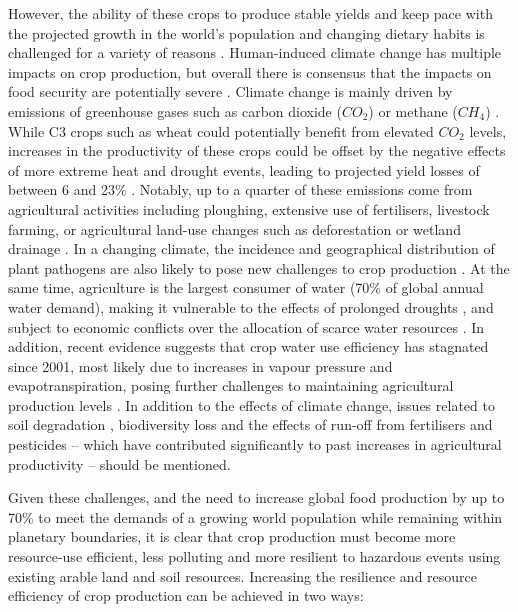 However, the ability of these crops to produce stable yields and keep pace with the projected growth in the world's population and changing dietary habits is challenged for a variety of reasons \citep{tilman_global_2011}. Human-induced climate change has multiple impacts on crop production, but overall there is consensus that the impacts on food security are potentially severe \citep{schmidhuber_global_2007,godfray_food_2010,rezaei_climate_2023}. Climate change is mainly driven by emissions of greenhouse gases such as carbon dioxide ($CO_2$) or methane ($CH_4$) \citep{ipcc_summary_2023}. While C3 crops such as wheat could potentially benefit from elevated $CO_2$ levels, increases in the productivity of these crops could be offset by the negative effects of more extreme heat and drought events, leading to projected yield losses of between 6 and 23\% \citep{rezaei_climate_2023}. Notably, up to a quarter of these emissions come from agricultural activities including ploughing, extensive use of fertilisers, livestock farming, or agricultural land-use changes such as deforestation or wetland drainage \citep{laborde_agricultural_2021}. In a changing climate, the incidence and geographical distribution of plant pathogens are also likely to pose new challenges to crop production \citep{burdon_climate_2020}. At the same time, agriculture is the largest consumer of water (70\% of global annual water demand), making it vulnerable to the effects of prolonged droughts \citep{meza_global-scale_2020}, and subject to economic conflicts over the allocation of scarce water resources \citep{rosa_global_2020}. In addition, recent evidence suggests that crop water use efficiency has stagnated since 2001, most likely due to increases in vapour pressure and evapotranspiration, posing further challenges to maintaining agricultural production levels \citep{li_global_2023}. In addition to the effects of climate change, issues related to soil degradation \citep{bindraban_assessing_2012}, biodiversity loss \citep{lanz_expansion_2018, abdi_biodiversity_2021} and the effects of run-off from fertilisers and pesticides -- which have contributed significantly to past increases in agricultural productivity \citep{pingali_green_2012} -- should be mentioned.

Given these challenges, and the need to increase global food production by up to 70\% to meet the demands of a growing world population \citep{hertel_global_2011} while remaining within planetary boundaries, it is clear that crop production must become more resource-use efficient, less polluting and more resilient to hazardous events using existing arable land and soil resources. Increasing the resilience and resource efficiency of crop production can be achieved in two ways:

